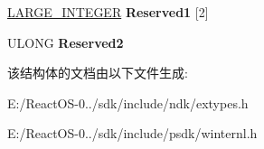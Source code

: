 \begin{DoxyCompactItemize}
\mbox{\label{struct___s_y_s_t_e_m___p_r_o_c_e_s_s_o_r___p_e_r_f_o_r_m_a_n_c_e___i_n_f_o_r_m_a_t_i_o_n_afa2c90794e3324ea8b1d98f3aec85cf7}} 
\hyperlink{union___l_a_r_g_e___i_n_t_e_g_e_r}{L\+A\+R\+G\+E\+\_\+\+I\+N\+T\+E\+G\+ER} {\bfseries Reserved1} \mbox{[}2\mbox{]}
\item 
\mbox{\label{struct___s_y_s_t_e_m___p_r_o_c_e_s_s_o_r___p_e_r_f_o_r_m_a_n_c_e___i_n_f_o_r_m_a_t_i_o_n_a554b5a966ebf11b05625123de3a04f1b}} 
U\+L\+O\+NG {\bfseries Reserved2}
\end{DoxyCompactItemize}


该结构体的文档由以下文件生成\+:\begin{DoxyCompactItemize}
\item 
E\+:/\+React\+O\+S-\/0../sdk/include/ndk/extypes.\+h\item 
E\+:/\+React\+O\+S-\/0../sdk/include/psdk/winternl.\+h\end{DoxyCompactItemize}
